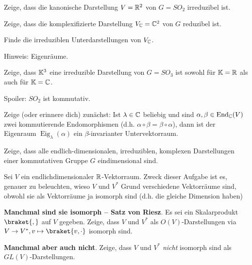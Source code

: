 \begin{sheet}
\begin{problem}[title={Kanonische Darstellung von $SO_2$}]\label{ex:fundamentaldarstellung_von_so2}
\begin{subproblem}
Zeige, dass die kanonische Darstellung $V=\mathbb{R}^2$ von $G=SO_2$ irreduzibel ist.
\end{subproblem}
\begin{subproblem}
Zeige, dass die komplexifizierte Darstellung $V_{\mathbb{C}}=\mathbb{C}^2$ von $G$ reduzibel ist.
\end{subproblem}
\begin{subproblem}
Finde die irreduziblen Unterdarstellungen von $V_{\mathbb{C}}$.

Hinweis: Eigenräume.
\end{subproblem}
\end{problem}

\begin{problem}[title={Die kanonische Darstellung von $SO_3$ ist irreduzibel}]\label{ex:fundamentaldarstellung_von_so3}
Zeige, dass $\mathbb{K}^3$ eine irreduzible Darstellung von $G=SO_3$ ist sowohl für $\mathbb{K}=\mathbb{R}$ als auch für $\mathbb{K}=\mathbb{C}$.
\end{problem}

\begin{problem}[title={Was geht bei $SO_2$ schief?}]
Spoiler: $SO_2$ ist kommutativ.

\begin{subproblem}
Zeige (oder erinnere dich) zunächst: Ist $\lambda\in\mathbb{C}$ beliebig und sind $\alpha,\beta\in\operatorname{End}_{\mathbb{C}}(V)$ zwei kommutierende Endomorphismen (d.h. $\alpha\circ\beta=\beta\circ\alpha$), dann ist der Eigenraum $\operatorname{Eig}_\lambda(\alpha)$ ein $\beta$-invarianter Untervektorraum.
\end{subproblem}
\begin{subproblem}
Zeige, dass alle endlich-dimensionalen, irreduziblen, komplexen Darstellungen einer kommutativen Gruppe $G$ eindimensional sind.
\end{subproblem}
\end{problem}

\begin{problem}[title={(Nicht-)Isomorphie von $V$ und $V^\ast$}]
Sei $V$ ein endlichdimensionaler $\mathbb{R}$-Vektorraum. Zweck dieser Aufgabe ist es, genauer zu beleuchten, wieso $V$ und $V^\ast$ Grund verschiedene Vektorräume sind, obwohl sie als Vektorräume ja isomorph sind (d.h. die gleiche Dimension haben)
\begin{subproblem}
\textbf{Manchmal sind sie isomorph -- Satz von Riesz}.
Es sei ein Skalarprodukt $\braket{,}$ auf $V$ gegeben. Zeige, dass $V$ und $V^\ast$ als $O(V)$-Darstellungen via $V\to V^\ast, v\mapsto \braket{v,\cdot}$ isomorph sind.
\end{subproblem}
\begin{subproblem}[difficulty={schwerer als man denkt}]
\textbf{Manchmal aber auch nicht}.
Zeige, dass $V$ und $V^\ast$ \emph{nicht} isomorph sind als $GL(V)$-Darstellungen.


\end{subproblem}
\end{problem}
\end{sheet}
